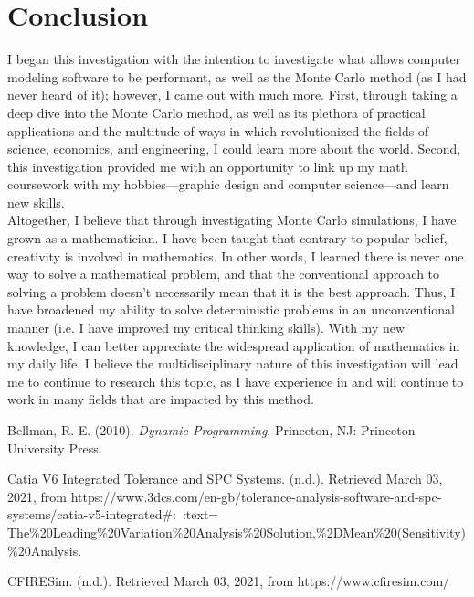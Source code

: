 \documentclass[11pt]{article}
\begin{document}
\section{Conclusion}
I began this investigation with the intention to investigate what allows computer modeling software to be performant, as well as the Monte Carlo method (as I had never heard of it); however, I came out with much more. First, through taking a deep dive into the Monte Carlo method, as well as its plethora of practical applications and the multitude of ways in which revolutionized the fields of science, economics, and engineering, I could learn more about the world. Second, this investigation provided me with an opportunity to link up my math coursework with my hobbies—graphic design and computer science—and learn new skills. \\[3ex]

Altogether, I believe that through investigating Monte Carlo simulations, I have grown as a mathematician. I have been taught that contrary to popular belief, creativity is involved in mathematics. In other words, I learned there is never one way to solve a mathematical problem, and that the conventional approach to solving a problem doesn't necessarily mean that it is the best approach. Thus, I have broadened my ability to solve deterministic problems in an unconventional manner (i.e. I have improved my critical thinking skills). With my new knowledge, I can better appreciate the widespread application of mathematics in my daily life. I believe the multidisciplinary nature of this investigation will lead me to continue to research this topic, as I have experience in and will continue to work in many fields that are impacted by this method. 


\newpage

\begin{thebibliography}{9}
Bellman, R. E. (2010). \emph{Dynamic Programming}. Princeton, NJ: Princeton University Press.

Catia V6 Integrated Tolerance and SPC Systems. (n.d.). Retrieved March 03, 2021, from https://www.3dcs.com/en-gb/tolerance-analysis-software-and-spc-systems/catia-v5-integrated\#:~:text=\\The\%20Leading\%20Variation\%20Analysis\%20Solution,\%2DMean\%20(Sensitivity)\%20Analysis.

CFIRESim. (n.d.). Retrieved March 03, 2021, from https://www.cfiresim.com/


\end{thebibliography}
\end{document}
